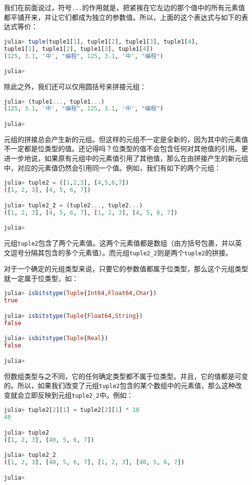 我们在前面说过，符号\verb|...|的作用就是，把紧挨在它左边的那个值中的所有元素值都平铺开来，并让它们都成为独立的参数值。所以，上面的这个表达式与如下的表达式等价：
\begin{lstlisting}[language=julia]
julia> tuple(tuple1[1], tuple1[2], tuple1[3], tuple1[4], 
tuple1[1], tuple1[2], tuple1[3], tuple1[4])
(125, 3.1, '中', "编程", 125, 3.1, '中', "编程")

julia> 
\end{lstlisting}

除此之外，我们还可以仅用圆括号来拼接元组：
\begin{lstlisting}[language=julia]
julia> (tuple1..., tuple1...)
(125, 3.1, '中', "编程", 125, 3.1, '中', "编程")

julia> 
\end{lstlisting}

元组的拼接总会产生新的元组。但这样的元组不一定是全新的，因为其中的元素值不一定都是位类型的值。还记得吗？位类型的值不会包含任何对其他值的引用。更进一步地说，如果原有元组中的元素值引用了其他值，那么在由拼接产生的新元组中，对应的元素值仍然会引用同一个值。例如，我们有如下的两个元组：
\begin{lstlisting}[language=julia]
julia> tuple2 = ([1,2,3], [4,5,6,7])
([1, 2, 3], [4, 5, 6, 7])

julia> tuple2_2 = (tuple2..., tuple2...)
([1, 2, 3], [4, 5, 6, 7], [1, 2, 3], [4, 5, 6, 7])

julia> 
\end{lstlisting}

元组\verb|tuple2|包含了两个元素值。这两个元素值都是数组（由方括号包裹，并以英文逗号分隔其包含的多个元素值）。而元组\verb|tuple2_2|则是两个\verb|tuple2|的拼接。

对于一个确定的元组类型来说，只要它的参数值都属于位类型，那么这个元组类型就一定属于位类型，如：
\begin{lstlisting}[language=julia]
julia> isbitstype(Tuple{Int64,Float64,Char})
true

julia> isbitstype(Tuple{Float64,String})
false

julia> isbitstype(Tuple{Real})
false

julia> 
\end{lstlisting}

但数组类型与之不同，它的任何确定类型都不属于位类型。并且，它的值都是可变的。所以，如果我们改变了元组\verb|tuple2|包含的某个数组中的元素值，那么这种改变就会立即反映到元组\verb|tuple2_2|中。例如：
\begin{lstlisting}[language=julia]
julia> tuple2[2][1] = tuple2[2][1] * 10
40

julia> tuple2
([1, 2, 3], [40, 5, 6, 7])

julia> tuple2_2
([1, 2, 3], [40, 5, 6, 7], [1, 2, 3], [40, 5, 6, 7])

julia> 
\end{lstlisting}

